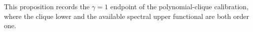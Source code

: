 This proposition records the \(\gamma=1\) endpoint of the polynomial-clique calibration, where the clique lower and the available spectral upper functional are both order one.